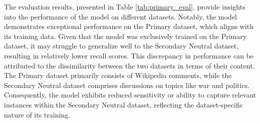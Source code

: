 \begin{table}[ht]
    \vspace{5pt}
    \caption{F-beta scores for different ratios}
    \label{tab:primary_eval}
\end{table}

The evaluation results, presented in Table \ref{tab:primary_eval}, provide insights into the performance of the model on different datasets. Notably, the model demonstrates exceptional performance on the Primary dataset, which aligns with its training data. Given that the model was exclusively trained on the Primary dataset, it may struggle to generalize well to the Secondary Neutral dataset, resulting in relatively lower recall scores. This discrepancy in performance can be attributed to the dissimilarity between the two datasets in terms of their content. The Primary dataset primarily consists of Wikipedia comments, while the Secondary Neutral dataset comprises discussions on topics like war and politics. Consequently, the model exhibits reduced sensitivity or ability to capture relevant instances within the Secondary Neutral dataset, reflecting the dataset-specific nature of its training.

